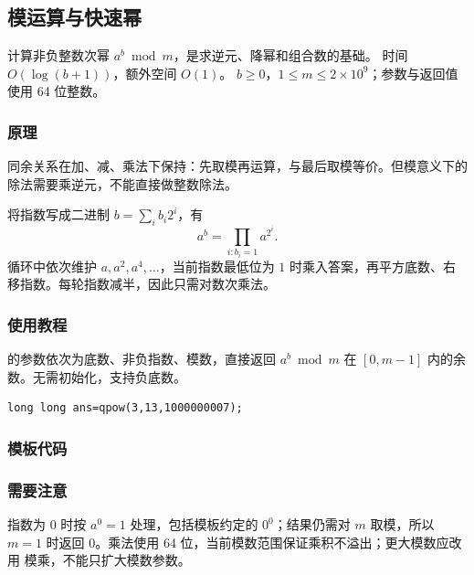 \subsection{模运算与快速幂}
\label{algo:qpow}
\AlgorithmInfo
    {计算非负整数次幂 $a^b\bmod m$，是求逆元、降幂和组合数的基础。}
    {时间 $O(\log(b+1))$，额外空间 $O(1)$。}
    {$b\geq0$，$1\leq m\leq2\times10^9$；参数与返回值使用 64 位整数。}

\subsubsection*{原理}
同余关系在加、减、乘法下保持：先取模再运算，与最后取模等价。但模意义下的除法需要乘逆元，不能直接做整数除法。

将指数写成二进制 $b=\sum_i b_i2^i$，有
\[
    a^b=\prod_{i:b_i=1}a^{2^i}.
\]
循环中依次维护 $a,a^2,a^4,\ldots$，当前指数最低位为 $1$ 时乘入答案，再平方底数、右移指数。每轮指数减半，因此只需对数次乘法。

\subsubsection*{使用教程}
 的参数依次为底数、非负指数、模数，直接返回 $a^b\bmod m$ 在 $[0,m-1]$ 内的余数。无需初始化，支持负底数。
\begin{lstlisting}[style=mtycpp,numbers=none]
long long ans=qpow(3,13,1000000007);
\end{lstlisting}

\subsubsection*{模板代码}

\subsubsection*{需要注意}
指数为 $0$ 时按 $a^0=1$ 处理，包括模板约定的 $0^0$；结果仍需对 $m$ 取模，所以 $m=1$ 时返回 $0$。乘法使用 64 位，当前模数范围保证乘积不溢出；更大模数应改用  模乘，不能只扩大模数参数。
